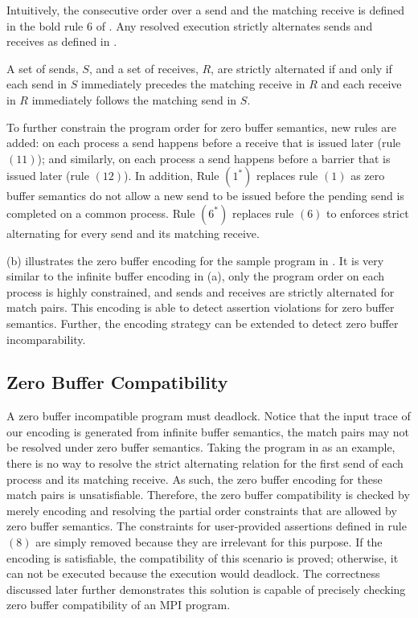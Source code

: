 Intuitively, the consecutive order over a send and the matching receive is defined in the bold rule $6$ of . Any resolved execution strictly alternates sends and receives as defined in . 

\begin{definition}\label{def:alternate}
A set of sends, $S$, and a set of receives, $R$, are strictly alternated if and only if each send in $S$ immediately precedes the matching receive in $R$ and each receive in $R$ immediately follows the matching send in $S$.
\end{definition}
To further constrain the program order for zero buffer semantics, new rules are added: on each process a send happens before a receive that is issued later (rule $(11)$); and similarly, on each process a send happens before a barrier that is issued later (rule $(12)$). In addition, Rule $(1^*)$ replaces rule $(1)$ as zero buffer semantics do not allow a new send to be issued before the pending send is completed on a common process. Rule $(6^*)$ replaces rule $(6)$ to enforces strict alternating for every send and its matching receive.

\encodingzb

(b) illustrates the zero buffer encoding for the sample program in . It is very similar to the infinite buffer encoding in (a), only the program order on each process is highly constrained, and sends and receives are strictly alternated for match pairs. This encoding is able to detect assertion violations for zero buffer semantics. Further, the encoding strategy can be extended to detect zero buffer incomparability. 

\subsection{Zero Buffer Compatibility}
A zero buffer incompatible program must deadlock. Notice that the input trace of our encoding is generated from infinite buffer semantics, the match pairs may not be resolved under zero buffer semantics. Taking the program in  as an example, there is no way to resolve the strict alternating relation for the first send of each process and its matching receive. As such, the zero buffer encoding for these match pairs is unsatisfiable. Therefore, the zero buffer compatibility is checked by merely encoding and resolving the partial order constraints that are allowed by zero buffer semantics. The constraints for user-provided assertions defined in rule $(8)$ are simply removed because they are irrelevant for this purpose. If the encoding is satisfiable, the compatibility of this scenario is proved; otherwise, it can not be executed because the execution would deadlock. The correctness discussed later further demonstrates this solution is capable of precisely checking zero buffer compatibility of an MPI program.

